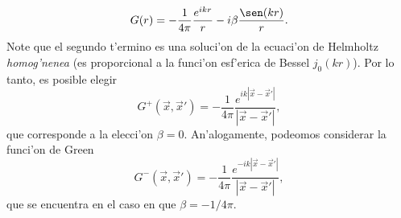 \begin{equation}\label{GH3d2}
G(r)=-\frac{1}{4\pi}\frac{e^{ikr}}{r}-i\beta\frac{\sen(kr)}{r}.
\end{equation}
Note que el segundo t'ermino es una soluci'on de la ecuaci'on de Helmholtz \textit{homog'nenea} (es proporcional a la funci'on esf'erica de Bessel $j_0(kr)$). Por lo tanto, es posible elegir
\begin{equation}\label{GH3d3}
\boxed{G^{+}(\vec{x},\vec{x}')=-\frac{1}{4\pi}\frac{e^{ik|\vec{x}-\vec{x}'|}}{|\vec{x}-\vec{x}'|},}
\end{equation}
que corresponde a la elecci'on $\beta=0$. An'alogamente, podeomos considerar la funci'on de Green 
\begin{equation}\label{GH3d4}
G^{-}(\vec{x},\vec{x}')=-\frac{1}{4\pi}\frac{e^{-ik|\vec{x}-\vec{x}'|}}{|\vec{x}-\vec{x}'|},
\end{equation}
que se encuentra en el caso en que $\beta=-1/4\pi$.

